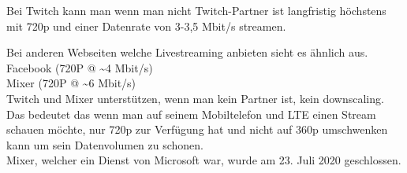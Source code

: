 
Bei Twitch kann man wenn man nicht Twitch-Partner ist langfristig höchstens mit 720p und einer Datenrate von 3-3,5 Mbit/s streamen.

Bei anderen Webseiten welche Livestreaming anbieten sieht es ähnlich aus.\\
Facebook (720P @ \textasciitilde 4 Mbit/s) \\
Mixer (720P @ \textasciitilde 6 Mbit/s) \\

Twitch und Mixer unterstützen, wenn man kein Partner ist, kein downscaling.
Das bedeutet das wenn man auf seinem Mobiltelefon und LTE einen Stream schauen möchte, nur 720p zur Verfügung hat und nicht auf 360p umschwenken kann um sein Datenvolumen zu schonen. \\

Mixer, welcher ein Dienst von Microsoft war, wurde am 23. Juli 2020 geschlossen.


\newpage
